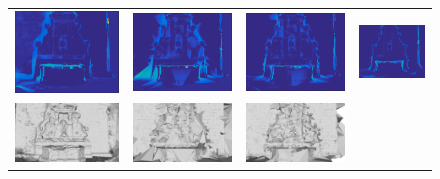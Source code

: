 \begin{figure}[t]
\setlength{\tabcolsep}{1px}
\centering
\begin{tabular}{cccc}
\includegraphics[width=0.25\columnwidth]{./img/errorPoisson}&
\includegraphics[width=0.25\columnwidth]{./img/errorMyFountainInit}&
\includegraphics[width=0.25\columnwidth]{./img/errorMyFountainNotSm}&
\includegraphics[width=0.25\columnwidth]{./img/Photofount}\\
\includegraphics[width=0.25\columnwidth]{./img/poissonUntex}&
\includegraphics[width=0.25\columnwidth]{./img/firstUntex}&
\includegraphics[width=0.25\columnwidth]{./img/myResUntex}&

\end{tabular}
\end{figure}
